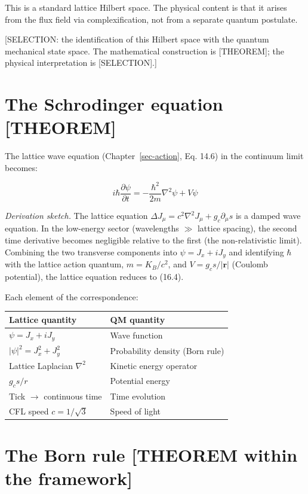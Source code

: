 \documentclass[
  11pt,
  letterpaper,
  twoside,
  openany]{book}
\makeatletter
\let\orig@section\section
\renewcommand{\section}{\needspace{8\baselineskip}\orig@section}
\makeatother
\begin{document}
This is a standard lattice Hilbert space. The physical content is that
it arises from the flux field via complexification, not from a separate
quantum postulate.

{[}SELECTION: the identification of this Hilbert space with the quantum
mechanical state space. The mathematical construction is {[}THEOREM{]};
the physical interpretation is {[}SELECTION{]}.{]}

\section{The Schrodinger equation
{[}THEOREM{]}}\label{the-schrodinger-equation-theorem}

The lattice wave equation (Chapter~\ref{sec-action}, Eq. 14.6) in the
continuum limit becomes:

\[
i\hbar \frac{\partial \psi}{\partial t} = -\frac{\hbar^2}{2m} \nabla^2 \psi + V\psi
\tag{16.4}
\]

\emph{Derivation sketch.} The lattice equation
\(\Delta J_\mu = c^2 \nabla^2 J_\mu + g_c \partial_\mu s\) is a damped
wave equation. In the low-energy sector (wavelengths \(\gg\) lattice
spacing), the second time derivative becomes negligible relative to the
first (the non-relativistic limit). Combining the two transverse
components into \(\psi = J_x + iJ_y\) and identifying \(\hbar\) with the
lattice action quantum, \(m = K_B/c^2\), and
\(V = g_c s / |\mathbf{r}|\) (Coulomb potential), the lattice equation
reduces to (16.4).

Each element of the correspondence:

\begin{longtable}[]{@{}ll@{}}
\toprule\noalign{}
Lattice quantity & QM quantity \\
\midrule\noalign{}
\endhead
\bottomrule\noalign{}
\endlastfoot
\(\psi = J_x + iJ_y\) & Wave function \\
\(|\psi|^2 = J_x^2 + J_y^2\) & Probability density (Born rule) \\
Lattice Laplacian \(\nabla^2\) & Kinetic energy operator \\
\(g_c s / r\) & Potential energy \\
Tick \(\to\) continuous time & Time evolution \\
CFL speed \(c = 1/\sqrt{3}\) & Speed of light \\
\end{longtable}

\section{The Born rule {[}THEOREM within the
framework{]}}\label{the-born-rule-theorem-within-the-framework}
\end{document}
